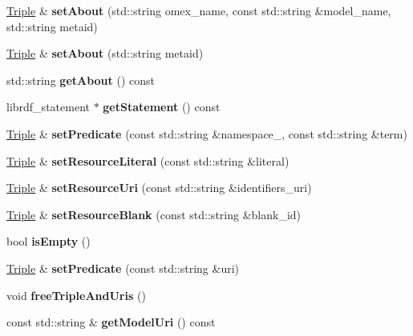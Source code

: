 \begin{DoxyCompactItemize}
\hyperlink{classomexmeta_1_1Triple}{Triple} \& {\bfseries set\+About} (std\+::string omex\+\_\+name, const std\+::string \&model\+\_\+name, std\+::string metaid)
\item 
\mbox{\label{classomexmeta_1_1Triple_a6329b09efb05005d248790e8a3d507f3}} 
\hyperlink{classomexmeta_1_1Triple}{Triple} \& {\bfseries set\+About} (std\+::string metaid)
\item 
\mbox{\label{classomexmeta_1_1Triple_a69df88d19e2f9077fccfa9543dadd15f}} 
std\+::string {\bfseries get\+About} () const
\item 
\mbox{\label{classomexmeta_1_1Triple_a886240fe50becaaa47ca171f2d454ba4}} 
librdf\+\_\+statement $\ast$ {\bfseries get\+Statement} () const
\item 
\mbox{\label{classomexmeta_1_1Triple_a57b4521321178af38415e76cd483207e}} 
\hyperlink{classomexmeta_1_1Triple}{Triple} \& {\bfseries set\+Predicate} (const std\+::string \&namespace\+\_\+, const std\+::string \&term)
\item 
\mbox{\label{classomexmeta_1_1Triple_a7358812badc8d0d5589a0165af4ad375}} 
\hyperlink{classomexmeta_1_1Triple}{Triple} \& {\bfseries set\+Resource\+Literal} (const std\+::string \&literal)
\item 
\mbox{\label{classomexmeta_1_1Triple_ae6836c6e9d06a310a120345aa95a4daa}} 
\hyperlink{classomexmeta_1_1Triple}{Triple} \& {\bfseries set\+Resource\+Uri} (const std\+::string \&identifiers\+\_\+uri)
\item 
\mbox{\label{classomexmeta_1_1Triple_a90ffe9b74d354cc3fe3132a07546f6d1}} 
\hyperlink{classomexmeta_1_1Triple}{Triple} \& {\bfseries set\+Resource\+Blank} (const std\+::string \&blank\+\_\+id)
\item 
\mbox{\label{classomexmeta_1_1Triple_a34832780748d58b0fddea6f6f079217a}} 
bool {\bfseries is\+Empty} ()
\item 
\mbox{\label{classomexmeta_1_1Triple_a1a99a566a9d1883c6329a023f4dbc056}} 
\hyperlink{classomexmeta_1_1Triple}{Triple} \& {\bfseries set\+Predicate} (const std\+::string \&uri)
\item 
\mbox{\label{classomexmeta_1_1Triple_ab89993902b551b98d9e17e4fe5ebed6b}} 
void {\bfseries free\+Triple\+And\+Uris} ()
\item 
\mbox{\label{classomexmeta_1_1Triple_ac379e5410a41c1946e91d581f023c7f5}} 
const std\+::string \& {\bfseries get\+Model\+Uri} () const
\end{DoxyCompactItemize}
